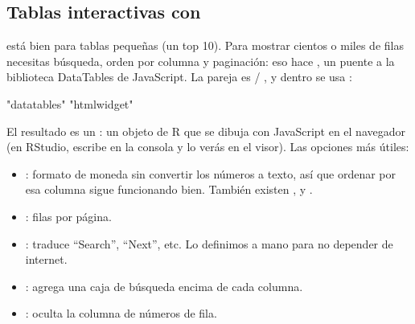 \subsection{Tablas interactivas con \texorpdfstring{}{DT}}
\label{sec:m6-dt}

 está bien para tablas pequeñas (un top 10). Para
mostrar cientos o miles de filas necesitas búsqueda, orden por columna y
paginación: eso hace , un puente a la biblioteca DataTables de
JavaScript. La pareja es  / , y
dentro se usa :

\begin{rsalida}
[1] "datatables" "htmlwidget"
\end{rsalida}

El resultado es un : un objeto de R que se dibuja con
JavaScript en el navegador (en RStudio, escribe  en la
consola y lo verás en el visor). Las opciones más útiles:

\begin{itemize}
  \item {}: formato de moneda
        sin convertir los números a texto, así que ordenar por esa columna
        sigue funcionando bien. También existen ,
         y .
  \item {}: filas por página.
  \item {}: traduce ``Search'', ``Next'', etc. Lo
        definimos a mano para no depender de internet.
  \item {}: agrega una caja de búsqueda encima de cada
        columna.
  \item {}: oculta la columna de números de fila.
\end{itemize}

